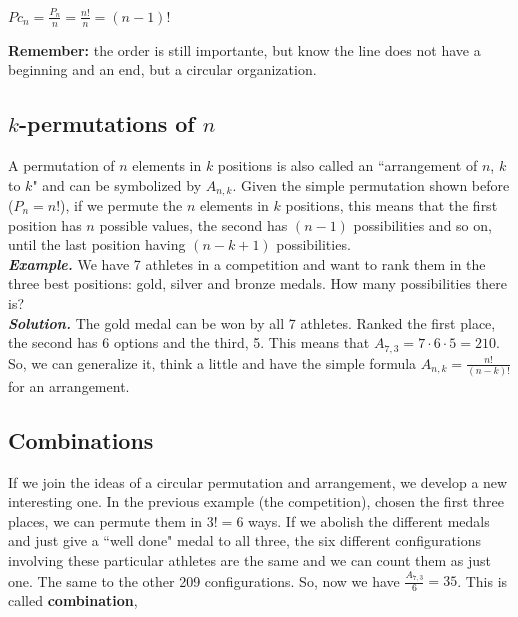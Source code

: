 \documentclass[a4paper,twocolumn]{article}
\begin{document}
\begin{center}
$Pc_n = \frac{P_n}{n} = \frac{n!}{n} = (n - 1)!$
\end{center}

\noindent\textbf{Remember:} the order is still importante, but know the line does not have a beginning and an end, but a circular organization.


\subsection{$k$-permutations of $n$}

A permutation of $n$ elements in $k$ positions is also called an ``arrangement of $n$, $k$ to $k$" and can be symbolized by $A_{n,k}$. Given the simple permutation shown before ($P_n = n!$), if we permute the $n$ elements in $k$ positions, this means that the first position has $n$ possible values, the second has $(n -1)$ possibilities and so on, until the last position having $(n - k + 1)$ possibilities.\\

\noindent\textbf{\textit{Example.}} We have 7 athletes in a competition and want to rank them in the three best positions: gold, silver and bronze medals. How many possibilities there is?\\
\noindent\textbf{\textit{Solution.}} The gold medal can be won by all 7 athletes. Ranked the first place, the second has 6 options and the third, 5. This means that $A_{7,3} = 7 \cdot 6 \cdot 5 = 210$.\\

\noindent So, we can generalize it, think a little and have the simple formula $A_{n,k} = \frac{n!}{(n - k)!}$ for an arrangement.


\subsection{Combinations}

If we join the ideas of a circular permutation and arrangement, we develop a new interesting one. In the previous example (the competition), chosen the first three places, we can permute them in $3! = 6$ ways. If we abolish the different medals and just give a ``well done" medal to all three, the six different configurations involving these particular athletes are the same and we can count them as just one. The same to the other 209 configurations. So, now we have $\frac{A_{7,3}}{6} = 35$. This is called \textbf{combination},
\end{document}
